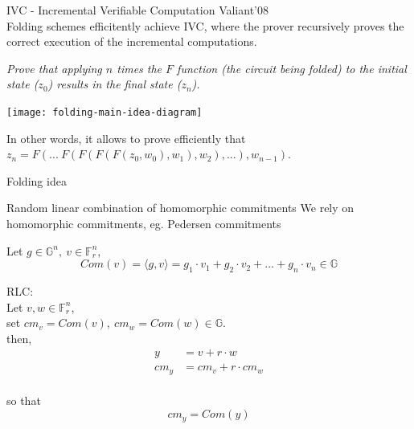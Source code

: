 \documentclass[t]{beamer}
\begin{document}
\begin{frame}{IVC - Incremental Verifiable Computation}
  {\tiny Valiant'08}\\
  Folding schemes efficitently achieve IVC, where the prover recursively proves the correct execution of the incremental computations.
  \vspace{0.5cm}

  \emph{Prove that applying $n$ times the $F$ function (the circuit being folded) to the initial state ($z_0$) results in the final state ($z_n$).}


  \texttt{[image: folding-main-idea-diagram]}

  In other words, it allows to prove efficiently that $z_n = F(...~F(F(F(F(z_0, w_0), w_1), w_2), ...), w_{n-1})$.
\end{frame}


\begin{frame}{Folding idea}
\end{frame}



\begin{frame}{Random linear combination of homomorphic commitments}
  \small{
    We rely on homomorphic commitments, eg. Pedersen commitments\\
  }

  Let $g \in \mathbb{G}^n,~ v \in \mathbb{F}_r^n$,\\
  $$Com(v) = \langle g, v \rangle =g_1 \cdot v_1 + g_2 \cdot v_2 + \ldots + g_n \cdot v_n \in \mathbb{G}$$

  RLC:\\
  Let $v, w \in \mathbb{F}_r^n$,
  \\set $cm_v = Com(v),~ cm_w=Com(w) \in \mathbb{G}$.
  \\then,
  \begin{align*}
    y &= v + r \cdot w\\
    cm_{y} &=cm_v + r \cdot cm_w
  \end{align*}
  \\so that
  $$cm_y = Com(y)$$

\end{frame}
\end{document}
